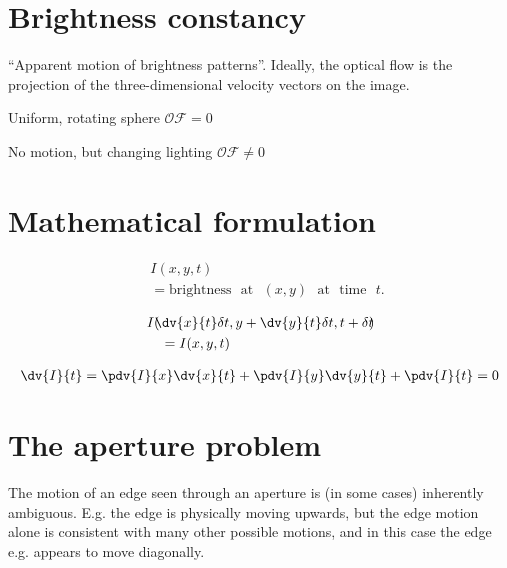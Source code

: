 \section{Brightness constancy}
\begin{compactdesc}
	\item[\lp{Definition of Optical Flow}]\hfill ``Apparent motion of brightness patterns''. Ideally, the optical flow is the projection of the three-dimensional velocity vectors on the image.
	\item[\lp{Caution required}]
		\begin{enumerate*}[label=\protect\circled{\arabic*}]
			\item Uniform, rotating sphere $\mathcal{OF}=0$
			\item No motion, but changing lighting $\mathcal{OF}\neq0$
		\end{enumerate*}
		\section{Mathematical formulation}
		\begin{align*}
		&I(x,y,t)\\
		\;&=\text{brightness}\text{ }\text{at}\text{ }(x,y)\text{ }\text{at}\text{ }\text{time}\text{ }t.
		\end{align*}
	\item[\lp{Brightness constancy assumption:}]
		\begin{align*}
			&I\!\left(\!\! \dv{x}{t}\delta t,y+\dv{y}{t} \delta t,t+\delta t \!\!\right)\!\\
			&\quad=I(x,y,t)
		\end{align*}
	\item[\lp{Optical flow constraint equation:}]
		\begin{gather*}
			\dv{I}{t}=\pdv{I}{x}\dv{x}{t}+\pdv{I}{y}\dv{y}{t}+\pdv{I}{t}=0
		\end{gather*}
		\section{The aperture problem}
		The motion of an edge seen through an aperture is (in some cases) inherently ambiguous. E.g. the edge is physically moving upwards, but the edge motion alone is consistent with many other possible motions, and in this case the edge e.g. appears to move diagonally.

\end{compactdesc}
